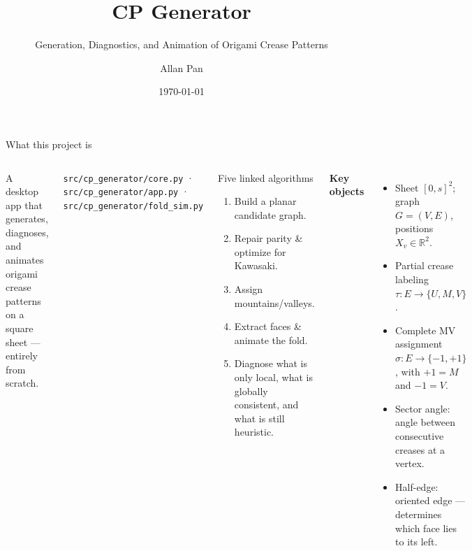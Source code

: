\documentclass[aspectratio=169,10pt]{beamer}
\title{\textbf{CP Generator}}
\subtitle{Generation, Diagnostics, and Animation of Origami Crease Patterns}
\author{Allan Pan}
\date{\today}
\newcommand{\RR}{\mathbb{R}}
\begin{document}
\maketitle

\begin{frame}{What this project is}
\begin{columns}[T,onlytextwidth]
A desktop app that generates, diagnoses, and animates origami crease patterns
on a square sheet — entirely from scratch.
\medskip

\textcolor{cpmid}{\small \texttt{src/cp\_generator/core.py} · \texttt{src/cp\_generator/app.py} · \texttt{src/cp\_generator/fold\_sim.py}}
\medskip

\begin{block}{Five linked algorithms}
\begin{enumerate}\small
  \item Build a planar candidate graph.
  \item Repair parity \& optimize for Kawasaki.
  \item Assign mountains/valleys.
  \item Extract faces \& animate the fold.
  \item Diagnose what is only local, what is globally consistent, and what is still heuristic.
\end{enumerate}
\end{block}

\textbf{Key objects}
\begin{itemize}\small
  \item Sheet \([0,s]^2\); graph \(G=(V,E)\), positions \(X_v\in\RR^2\).
  \item Partial crease labeling \(\tau:E\to\{U,M,V\}\).
  \item Complete MV assignment \(\sigma:E\to\{-1,+1\}\), with \(+1=M\) and \(-1=V\).
  \item \alert{Sector angle}: angle between consecutive creases at a vertex.
  \item \alert{Half-edge}: oriented edge — determines which face lies to its left.
\end{itemize}
\end{columns}
\end{frame}
\end{document}
